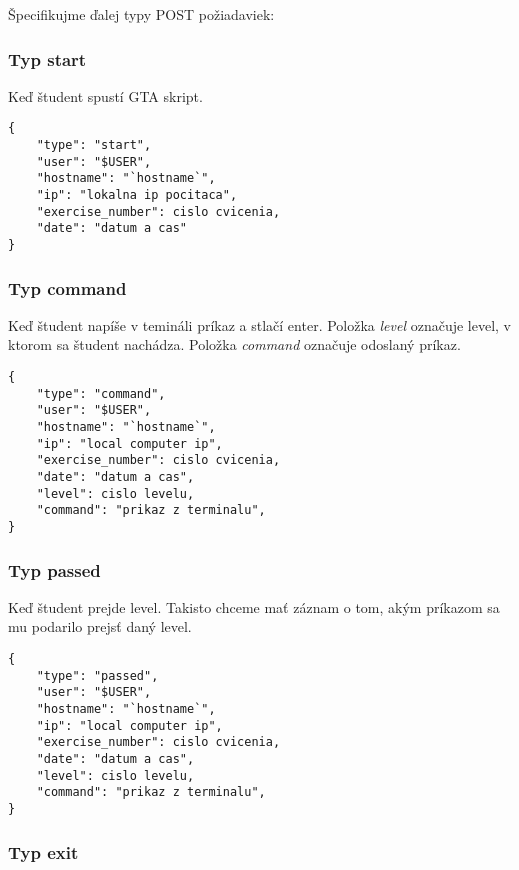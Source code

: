 Špecifikujme ďalej typy POST požiadaviek:

\subsubsection{Typ start}
\label{sec:apprequirements:gtadata:start}

Keď študent spustí GTA skript.

\begin{lstlisting}
{
    "type": "start",
    "user": "$USER",
    "hostname": "`hostname`",
    "ip": "lokalna ip pocitaca",
    "exercise_number": cislo cvicenia,
    "date": "datum a cas"
}
\end{lstlisting}

\subsubsection{Typ command}
\label{sec:apprequirements:gtadata:command}

Keď študent napíše v temináli príkaz a stlačí enter.
Položka \textit{level} označuje level, v ktorom sa študent nachádza. Položka
\textit{command} označuje odoslaný príkaz.

\begin{lstlisting}
{
    "type": "command",
    "user": "$USER",
    "hostname": "`hostname`",
    "ip": "local computer ip",
    "exercise_number": cislo cvicenia,
    "date": "datum a cas",
    "level": cislo levelu,
    "command": "prikaz z terminalu",
}
\end{lstlisting}

\subsubsection{Typ passed}
\label{sec:apprequirements:gtadata:passed}

Keď študent prejde level. Takisto chceme mať záznam o tom, akým príkazom sa mu podarilo
prejsť daný level.

\begin{lstlisting}
{
    "type": "passed",
    "user": "$USER",
    "hostname": "`hostname`",
    "ip": "local computer ip",
    "exercise_number": cislo cvicenia,
    "date": "datum a cas",
    "level": cislo levelu,
    "command": "prikaz z terminalu",
}
\end{lstlisting}

\subsubsection{Typ exit}
\label{sec:apprequirements:gtadata:exit}

